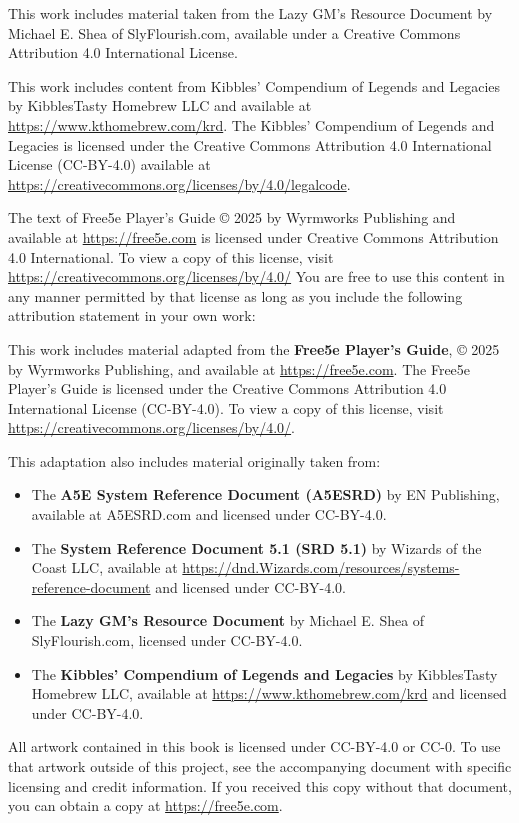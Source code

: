 This work includes material taken from the Lazy GM's Resource Document
by Michael E. Shea of SlyFlourish.com, available under a Creative
Commons Attribution 4.0 International License.

This work includes content from Kibbles' Compendium of Legends and
Legacies by KibblesTasty Homebrew LLC and available at
\url{https://www.kthomebrew.com/krd}. The Kibbles' Compendium of Legends
and Legacies is licensed under the Creative Commons Attribution 4.0
International License (CC-BY-4.0) available at
\url{https://creativecommons.org/licenses/by/4.0/legalcode}.

The text of Free5e Player's Guide © 2025 by Wyrmworks Publishing and
available at \url{https://free5e.com} is licensed under Creative Commons
Attribution 4.0 International. To view a copy of this license, visit
\url{https://creativecommons.org/licenses/by/4.0/} You are free to use
this content in any manner permitted by that license as long as you
include the following attribution statement in your own work:

This work includes material adapted from the \textbf{Free5e Player's
Guide}, © 2025 by Wyrmworks Publishing, and available at
\url{https://free5e.com}. The Free5e Player's Guide is licensed under
the Creative Commons Attribution 4.0 International License (CC-BY-4.0).
To view a copy of this license, visit
\url{https://creativecommons.org/licenses/by/4.0/}.

This adaptation also includes material originally taken from:

\begin{itemize}
\item
  The \textbf{A5E System Reference Document (A5ESRD)} by EN Publishing,
  available at A5ESRD.com and licensed under CC-BY-4.0.
\item
  The \textbf{System Reference Document 5.1 (SRD 5.1)} by Wizards of the
  Coast LLC, available at
  \url{https://dnd.Wizards.com/resources/systems-reference-document} and
  licensed under CC-BY-4.0.
\item
  The \textbf{Lazy GM's Resource Document} by Michael E. Shea of
  SlyFlourish.com, licensed under CC-BY-4.0.
\item
  The \textbf{Kibbles' Compendium of Legends and Legacies} by
  KibblesTasty Homebrew LLC, available at
  \url{https://www.kthomebrew.com/krd} and licensed under CC-BY-4.0.
\end{itemize}

All artwork contained in this book is licensed under CC-BY-4.0 or CC-0.
To use that artwork outside of this project, see the accompanying
document with specific licensing and credit information. If you received
this copy without that document, you can obtain a copy at
\url{https://free5e.com}.
